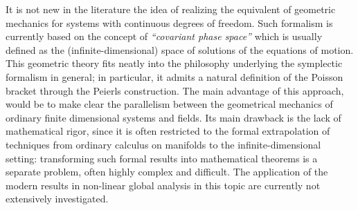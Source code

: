 \documentclass[Main]{subfiles}
\begin{document}
	It is not new in the literature the idea of realizing the equivalent of geometric mechanics for systems with continuous degrees of freedom. Such formalism is currently based on the concept of \emph{“covariant phase space”} which is usually defined as the (infinite-dimensional) space of solutions of the equations of motion. 
				This geometric theory fits neatly into the philosophy underlying the symplectic formalism in general; in particular, it admits a natural definition of the Poisson bracket through the Peierls construction.
		The main advantage of this approach, would be to make clear the parallelism between the geometrical mechanics of ordinary finite dimensional systems and fields. 
		Its main drawback is the lack of mathematical rigor, since it is often restricted to the formal extrapolation of techniques from ordinary calculus on manifolds to the infinite-dimensional setting: transforming such formal results into mathematical theorems is a separate problem, often highly complex and difficult.		
		The application of the modern results in non-linear global analysis in this topic are currently not extensively investigated.
	
\end{document}
